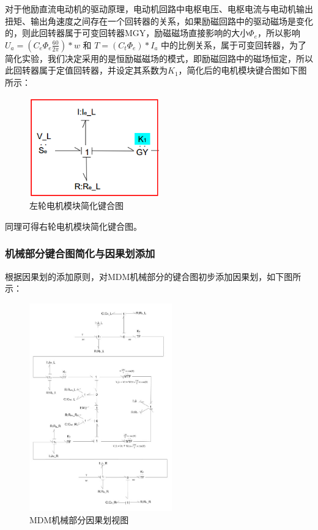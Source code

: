 对于他励直流电动机的驱动原理，电动机回路中电枢电压、电枢电流与电动机输出扭矩、输出角速度之间存在一个回转器的关系，如果励磁回路中的驱动磁场是变化的，则此回转器属于可变回转器MGY，励磁磁场直接影响的大小$ \Phi_e $，所以影响 $U_a=\left(C_e \Phi_e \frac{60}{2 \pi}\right) * w$ 和 $T=(C_t \Phi_e) * I_a$ 中的比例关系，属于可变回转器，为了简化实验，我们决定采用的是恒励磁磁场的模式，即励磁回路中的磁场恒定，所以此回转器属于定值回转器，并设定其系数为$ K_1 $，简化后的电机模块键合图如下图所示：
\begin{figure}[H]
	\centering
	\includegraphics[width=0.5\textwidth]{fig/bond/MDM2.png}
	\caption{左轮电机模块简化键合图}\label{fig:bond_MDM2}
\end{figure}

同理可得右轮电机模块简化键合图。

\subsubsection{机械部分键合图简化与因果划添加}

根据因果划的添加原则，对MDM机械部分的键合图初步添加因果划，如下图所示：
\begin{figure}[H]
	\centering
	\includegraphics[width=0.55\textwidth]{fig/bond/MDM3.png}
	\caption{MDM机械部分因果划视图}\label{fig:bond_MDM3}
\end{figure}

